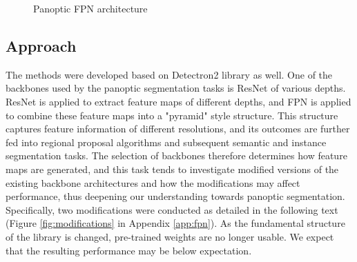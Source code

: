 \documentclass[10pt,twocolumn,letterpaper]{article}
\begin{document}
\begin{figure}[htbp]
\centering
{}
\caption{Panoptic FPN architecture}
\label{fig:fpn}
\end{figure}

\subsection{Approach}



The methods were developed based on Detectron2 library as well. One of the backbones used by the panoptic segmentation tasks is ResNet of various depths. ResNet is applied to extract feature maps of different depths, and FPN is applied to combine these feature maps into a "pyramid" style structure. This structure captures feature information of different resolutions, and its outcomes are further fed into regional proposal algorithms and subsequent semantic and instance segmentation tasks. The selection of backbones therefore determines how feature maps are generated, and this task tends to investigate modified versions of the existing backbone architectures and how the modifications may affect performance, thus deepening our understanding towards panoptic segmentation. Specifically, two modifications were conducted as detailed in the following text (Figure \ref{fig:modifications} in Appendix \ref{app:fpn}). As the fundamental structure of the library is changed, pre-trained weights are no longer usable. We expect that the resulting performance may be below expectation. 


\end{document}
